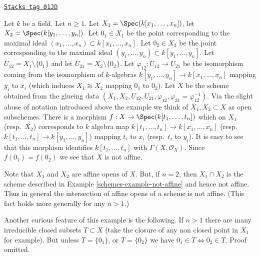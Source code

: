 \begin{example}

\label{schemes-example-affine-space-zero-doubled}
\href{https://stacks.math.columbia.edu/tag/01JD}{\texttt{Stacks tag 01JD}}

Let $k$ be a field. Let $n \geq 1$.
Let $X_1 = \Spec(k[x_1, \ldots, x_n])$,
let $X_2 = \Spec(k[y_1, \ldots, y_n])$.
Let $0_1 \in X_1$ be the point corresponding to the maximal ideal
$(x_1, \ldots, x_n) \subset k[x_1, \ldots, x_n]$.
Let $0_2 \in X_2$ be the point corresponding to the maximal ideal
$(y_1, \ldots, y_n) \subset k[y_1, \ldots, y_n]$.
Let $U_{12} = X_1 \setminus \{0_1\}$ and
let $U_{21} = X_2 \setminus \{0_2\}$. Let
$\varphi_{12} : U_{12} \to U_{21}$ be the isomorphism
coming from the isomorphism of $k$-algebras
$k[y_1, \ldots, y_n] \to k[x_1, \ldots, x_n]$
mapping $y_i$ to $x_i$ (which induces $X_1 \cong X_2$ mapping
$0_1$ to $0_2$).
Let $X$ be the scheme obtained from the glueing data
$(X_1, X_2, U_{12}, U_{21}, \varphi_{12},
\varphi_{21} = \varphi_{12}^{-1})$. Via the slight abuse
of notation introduced above the example we think of
$X_1, X_2 \subset X$ as open subschemes.
There is a morphism $f : X \to \Spec(k[t_1, \ldots, t_n])$
which on $X_1$ (resp.\ $X_2$) corresponds to $k$ algebra map
$k[t_1, \ldots, t_n] \to k[x_1, \ldots, x_n]$
(resp.\ $k[t_1, \ldots, t_n] \to k[y_1, \ldots, y_n]$)
mapping $t_i$ to $x_i$ (resp.\  $t_i$ to $y_i$).
It is easy to see that this morphism identifies
$k[t_1, \ldots, t_n]$ with $\Gamma(X, \mathcal{O}_X)$. Since
$f(0_1) = f(0_2)$ we see that $X$ is not affine.

\medskip\noindent
Note that $X_1$ and $X_2$ are affine opens of $X$.
But, if $n = 2$, then $X_1 \cap X_2$ is the scheme
described in Example \ref{schemes-example-not-affine} and hence not affine.
Thus in general the intersection of affine opens of a scheme
is not affine. (This fact holds more generally for any $n > 1$.)

\medskip\noindent
Another curious feature of this example is the following.
If $n > 1$ there are many irreducible closed subsets $T \subset X$
(take the closure of any non closed point in $X_1$ for example).
But unless $T = \{0_1\}$, or $T = \{0_2\}$ we have
$0_1 \in T \Leftrightarrow 0_2 \in T$. Proof omitted.
\end{example}

